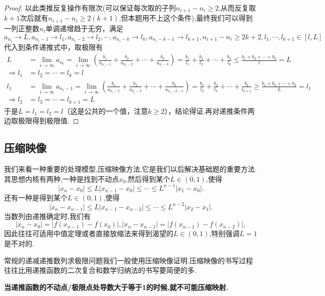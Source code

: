 \documentclass[../../main.tex]{subfiles}%
\begin{document}
\begin{proof}
以此类推反复操作有限次(可以保证每次取的子列$n_{i+1}-n_i\geqslant  2$,从而反复取$k+1$次后就有$n_{i+1}-n_i\geqslant  2(k+1)$,但本题用不上这个条件),最终我们可以得到一列正整数\(n_i\)单调递增趋于无穷，满足
\[a_{n_i}\to L,a_{n_i - 1}\to l_1,a_{n_i - 2}\to l_2,\cdots,a_{n_i - k}\to l_k,a_{n_i - k - 1}\to l_{k + 1},n_{i + 1}-n_i\geqslant 2k + 2,l_1,\cdots,l_{k + 1}\in[l,L]\]
代入到条件递推式中，取极限有
\begin{align*}
L&=\lim_{i\rightarrow\infty}a_{n_i}=\lim_{i\rightarrow\infty}\left(\frac{b_1}{a_{n_i - 1}}+\frac{b_2}{a_{n_i - 2}}+\cdots+\frac{b_k}{a_{n_i - k}}\right)=\frac{b_1}{l_1}+\frac{b_2}{l_2}+\cdots+\frac{b_k}{l_k}\leqslant \frac{b_1 + b_2+\cdots + b_k}{l}=L\\
\Rightarrow l_1&=l_2=\cdots=l_k = l\\
l_1&=\lim_{i\rightarrow\infty}a_{n_i - 1}=\lim_{i\rightarrow\infty}\left(\frac{b_1}{a_{n_i - 2}}+\frac{b_2}{a_{n_i - 3}}+\cdots+\frac{b_k}{a_{n_i - k - 1}}\right)=\frac{b_1}{l_2}+\frac{b_2}{l_3}+\cdots+\frac{b_k}{l_{k + 1}}\geqslant \frac{b_1 + b_2+\cdots + b_k}{L}=l_1\\
\Rightarrow l_2&=l_3=\cdots=l_{k + 1}=L
\end{align*}
于是\(L = l_1 = l_2=l\)（这是公共的一个值，注意\(k\geqslant 2\)），结论得证.再对递推条件两边取极限得到极限值.
\end{proof}



\subsection{压缩映像}
我们来看一种重要的处理模型,压缩映像方法,它是我们以后解决基础题的重要方法.其思想内核有两种,一种是找到不动点\(x_0\),然后得到某个\(L\in(0,1)\),使得
\[
|x_n - x_0|\leqslant  L|x_{n - 1} - x_0|\leqslant \cdots\leqslant  L^{n - 1}|x_1 - x_0|.
\]
还有一种是得到某个\(L\in(0,1)\),使得
\[
|x_n - x_{n - 1}|\leqslant  L|x_{n - 1} - x_{n - 2}|\leqslant \cdots\leqslant  L^{n - 2}|x_2 - x_1|.
\]
当数列由递推确定时,我们有
\[
|x_n - x_0| = |f(x_{n - 1}) - f(x_0)|,|x_n - x_{n - 1}| = |f(x_{n - 1}) - f(x_{n - 2})|,
\]
因此往往可适用中值定理或者直接放缩法来得到渴望的\(L\in(0,1)\),特别强调\(L = 1\)是不对的.

\begin{note}
常规的递减递推数列求极限问题我们一般使用压缩映像证明.压缩映像的书写过程往往比用递推函数的二次复合和数学归纳法的书写要简便的多.
\end{note}

\begin{remark}
\textbf{当递推函数的不动点/极限点处导数大于等于1的时候,就不可能压缩映射.}
\end{remark}
\end{document}
